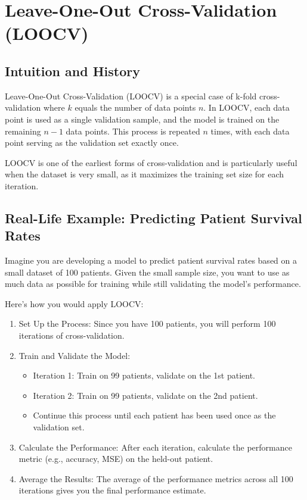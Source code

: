 \documentclass[10pt]{article}
\begin{document}
\section{Leave-One-Out Cross-Validation (LOOCV)}
\subsection{Intuition and History}
Leave-One-Out Cross-Validation (LOOCV) is a special case of k-fold cross-validation where \(k\) equals the number of data points \(n\). In LOOCV, each data point is used as a single validation sample, and the model is trained on the remaining \(n-1\) data points. This process is repeated \(n\) times, with each data point serving as the validation set exactly once.

LOOCV is one of the earliest forms of cross-validation and is particularly useful when the dataset is very small, as it maximizes the training set size for each iteration.

\subsection{Real-Life Example: Predicting Patient Survival Rates}
Imagine you are developing a model to predict patient survival rates based on a small dataset of 100 patients. Given the small sample size, you want to use as much data as possible for training while still validating the model's performance.

Here’s how you would apply LOOCV:

\begin{enumerate}
    \item Set Up the Process: Since you have 100 patients, you will perform 100 iterations of cross-validation.
    \item Train and Validate the Model:
    \begin{itemize}
        \item Iteration 1: Train on 99 patients, validate on the 1st patient.
        \item Iteration 2: Train on 99 patients, validate on the 2nd patient.
        \item Continue this process until each patient has been used once as the validation set.
    \end{itemize}
    \item Calculate the Performance: After each iteration, calculate the performance metric (e.g., accuracy, MSE) on the held-out patient.
    \item Average the Results: The average of the performance metrics across all 100 iterations gives you the final performance estimate.
\end{enumerate}
\end{document}
